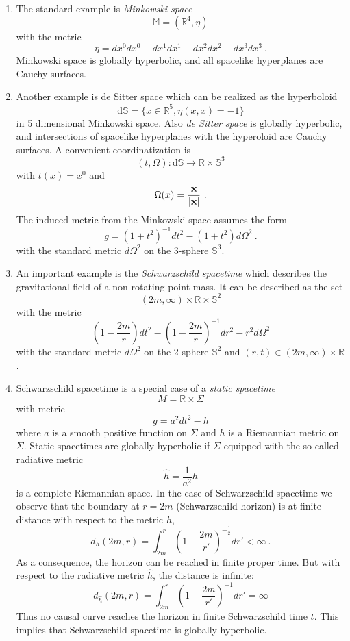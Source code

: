 \documentclass[11pt]{article}
\newcommand{\dS}{\mathrm{d}\mathbb{S}}
\newcommand{\x}{{\bf x}}
\newcommand{\RR}{\mathbb{R}}           %
\newcommand{\1}{\mathds{1}}                         %
\begin{document}
\begin{enumerate}
\item 
The standard example is \textit{Minkowski space}
\[\mathbb{M}=(\RR^4,\eta)\]
with the metric
\[\eta=dx^0dx^0-dx^1dx^1-dx^2dx^2-dx^3dx^3 \ .\]
Minkowski space is globally hyperbolic, and all spacelike hyperplanes are Cauchy surfaces.
\item
Another example is de Sitter space which can be realized as the hyperboloid
\[\mathrm d\mathbb{S}=\{x\in\mathbb R^5, \eta(x,x)=-1\}\]
in 5 dimensional Minkowski space. Also \textit{de Sitter space} is globally hyperbolic, and intersections of spacelike hyperplanes with the hyperoloid are Cauchy surfaces.
A convenient coordinatization is
\[(t,\Omega):\dS\to \RR\times\mathbb{S}^3\] 
with $t(x)=x^0$ and 
\[\Omega(x)=\frac{\x}{|\x|} \ .\]
The induced metric from the Minkowski space assumes the form
\[g=(1+t^2)^{-1}dt^2-(1+t^2)d\Omega^2\ .\]
with the standard metric $d\Omega^2$ on the 3-sphere $\mathbb{S}^3$.
\item An important example is the \textit{Schwarzschild spacetime} which describes the gravitational field of a non rotating point mass.
It can be described as the set
\[(2m,\infty)\times\RR\times \mathbb{S}^2\]
with the metric
\[\left(1-\frac{2m}{r}\right)dt^2-\left(1-\frac{2m}{r}\right)^{-1}dr^2-r^2d\Omega^2\]
with the standard metric $d\Omega^2$ on the 2-sphere $\mathbb{S}^2$ and $(r,t)\in(2m,\infty)\times\RR$.
\item Schwarzschild spacetime is a special case of a \textit{static spacetime}
\[M=\mathbb{R}\times \Sigma\]
with metric
\[g=a^2dt^2-h\]
where $a$ is a smooth positive function on $\Sigma$ and $h$ is a Riemannian metric on $\Sigma$. Static spacetimes are globally hyperbolic if $\Sigma$ equipped with the so called radiative metric
\[\hat{h}=\frac{1}{a^2}h\]
is a complete Riemannian space. In the case of Schwarzschild spacetime we observe that the boundary at $r=2m$ (Schwarzschild horizon) is at finite distance with respect to the metric $h$,
\[d_h(2m,r)=\int_{2m}^r \left(1-\frac{2m}{r'}\right)^{-\frac12}dr'<\infty\ .\]
{As a consequence, the horizon can be reached in finite proper time.}
But with respect to the radiative metric $\hat h$, the distance is infinite:
\[d_{\hat h}(2m,r)=\int_{2m}^r\left(1-\frac{2m}{r'}\right)^{-1}dr'=\infty\]
{Thus no causal curve reaches the horizon in finite Schwarzschild time $t$. This implies that Schwarzschild spacetime is globally hyperbolic.}


\end{enumerate}
\end{document}
